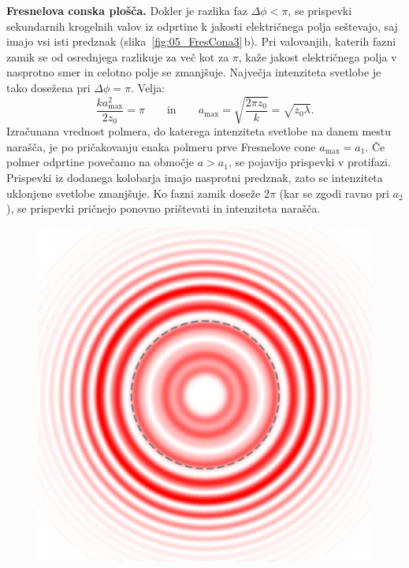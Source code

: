 \begin{example}{\bf Fresnelova conska plošča.}
Dokler je razlika faz $\Delta \phi < \pi$, se prispevki sekundarnih krogelnih valov iz odprtine k jakosti
električnega polja seštevajo, saj imajo vsi isti predznak (slika~\ref{fig:05_FresCona3}\,b). Pri valovanjih,
katerih fazni zamik se od osrednjega razlikuje za več kot za $\pi$, kaže jakost električnega polja
v nasprotno smer in celotno polje se zmanjšuje. Največja intenziteta svetlobe je tako dosežena pri 
$\Delta \phi = \pi$. Velja:
\begin{equation}
\frac{ka_\mathrm{max}^2}{2z_0} = \pi \qquad \mathrm{in} \qquad a_\mathrm{max} = 
\sqrt{\frac{2\pi z_0}{k}} = \sqrt{z_0 \lambda}. 
\label{eq:05_87c}
\end{equation}
Izračunana vrednost polmera, do katerega intenziteta svetlobe na danem mestu narašča, je po pričakovanju enaka 
polmeru prve Fresnelove cone $a_\mathrm{max} = a_1$.  
Če polmer odprtine povečamo na območje $a>a_1$, 
se pojavijo prispevki v protifazi. Prispevki iz dodanega kolobarja imajo nasprotni predznak, zato se 
intenziteta uklonjene svetlobe zmanjšuje. Ko fazni zamik doseže $2\pi$ (kar se zgodi
ravno pri $a_2$), se prispevki pričnejo ponovno prištevati in intenziteta  narašča. 
 \begin{figure}[ht]
\centering
\includegraphics[width=40truemm]{slike/05_Fresnel_circ_k11_r1.png}\qquad

\end{figure}
\end{example}
